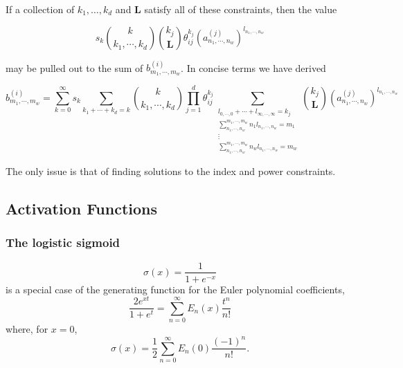 If a collection of $k_1, \ldots, k_d$ and $\mathbf{L}$ satisfy all of these constraints, then the value

\begin{equation*}
    s_k \binom{k}{k_1, \cdots, k_d} \binom{k_j}{\mathbf{L}} \theta_{ij}^{k_j} (a^{(j)}_{n_1, \cdots, n_w})^{l_{n_1, \cdots, n_w}}
\end{equation*}

may be pulled out to the sum of $b^{(i)}_{m_1, \cdots, m_w}$. In concise terms we have derived

\begin{equation}
    b^{(i)}_{m_1, \cdots, m_w} = \sum_{k=0}^{\infty} s_k \sum_{k_1 + \cdots + k_d = k} \binom{k}{k_1, \cdots, k_d} \prod_{j=1}^{d} \theta_{ij}^{k_j} \sum_{\substack{l_{0, \cdots, 0} + \cdots + l_{\infty, \cdots, \infty} = k_j \\ \sum_{n_1, \cdots, n_w}^{m_1, \cdots, m_w} n_1 l_{n_1, \cdots, n_w} = m_1 \\ \vdots \\ \sum_{n_1, \cdots, n_w}^{m_1, \cdots, m_w} n_w l_{n_1, \cdots, n_w} = m_w}} \binom{k_j}{\mathbf{L}} (a^{(j)}_{n_1, \cdots, n_w})^{l_{n_1, \cdots, n_w}}
\end{equation}

The only issue is that of finding solutions to the index and power constraints.



\subsection{Activation Functions}
\subsubsection{The logistic sigmoid}
\begin{equation}
	\sigma(x) = \frac{1}{1 + e^{-x}}
	\label{eqn:sigmoid}
\end{equation}
is a special case of the generating function for the Euler polynomial coefficients,
\begin{equation}
	\frac{2e^{x t}}{1 + e^t} = \sum_{n=0}^\infty E_n(x) \frac{t^n}{n!}
\end{equation}
where, for $x = 0$,
\begin{equation}
	\sigma(x) = \frac{1}{2} \sum_{n=0}^\infty E_n(0) \frac{(-1)^n}{n!}.
	\label{eqn:sigmoid Euler expansion}
\end{equation}

